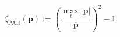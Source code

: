 \begin{equation}
	\zeta_\text{PAR}(\textbf{p}) := \left(\frac{\max_t|\textbf{p}|}{\overline{\textbf{p}}}\right)^2 - 1
	\label{ch2:equ:cost-par}
\end{equation}